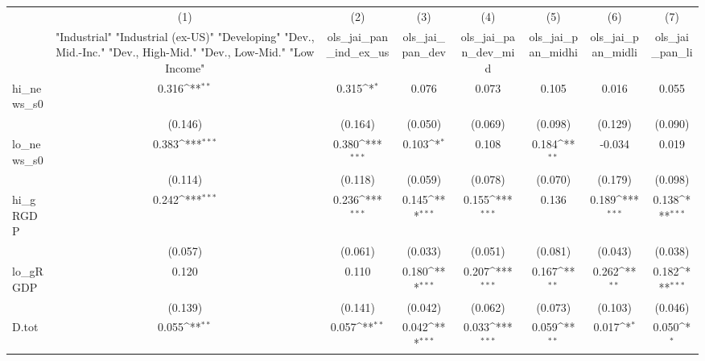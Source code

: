 {
\def\sym#1{\ifmmode^{#1}\else\(^{#1}\)\fi}
\begin{tabular}{l*{7}{c}}
\toprule
            &\multicolumn{1}{c}{(1)}&\multicolumn{1}{c}{(2)}&\multicolumn{1}{c}{(3)}&\multicolumn{1}{c}{(4)}&\multicolumn{1}{c}{(5)}&\multicolumn{1}{c}{(6)}&\multicolumn{1}{c}{(7)}\\
            &\multicolumn{1}{c}{ "Industrial" "Industrial (ex-US)" "Developing" "Dev., Mid.-Inc." "Dev., High-Mid."  "Dev., Low-Mid." "Low Income" }&\multicolumn{1}{c}{ols\_jai\_pan\_ind\_ex\_us}&\multicolumn{1}{c}{ols\_jai\_pan\_dev}&\multicolumn{1}{c}{ols\_jai\_pan\_dev\_mid}&\multicolumn{1}{c}{ols\_jai\_pan\_midhi}&\multicolumn{1}{c}{ols\_jai\_pan\_midli}&\multicolumn{1}{c}{ols\_jai\_pan\_li}\\
\midrule
hi\_news\_s0  &       0.316\sym{**} &       0.315\sym{*}  &       0.076         &       0.073         &       0.105         &       0.016         &       0.055         \\
            &     (0.146)         &     (0.164)         &     (0.050)         &     (0.069)         &     (0.098)         &     (0.129)         &     (0.090)         \\
\addlinespace
lo\_news\_s0  &       0.383\sym{***}&       0.380\sym{***}&       0.103\sym{*}  &       0.108         &       0.184\sym{**} &      -0.034         &       0.019         \\
            &     (0.114)         &     (0.118)         &     (0.059)         &     (0.078)         &     (0.070)         &     (0.179)         &     (0.098)         \\
\addlinespace
hi\_gRGDP    &       0.242\sym{***}&       0.236\sym{***}&       0.145\sym{***}&       0.155\sym{***}&       0.136         &       0.189\sym{***}&       0.138\sym{***}\\
            &     (0.057)         &     (0.061)         &     (0.033)         &     (0.051)         &     (0.081)         &     (0.043)         &     (0.038)         \\
\addlinespace
lo\_gRGDP    &       0.120         &       0.110         &       0.180\sym{***}&       0.207\sym{***}&       0.167\sym{**} &       0.262\sym{**} &       0.182\sym{***}\\
            &     (0.139)         &     (0.141)         &     (0.042)         &     (0.062)         &     (0.073)         &     (0.103)         &     (0.046)         \\
\addlinespace
D.tot       &       0.055\sym{**} &       0.057\sym{**} &       0.042\sym{***}&       0.033\sym{***}&       0.059\sym{**} &       0.017\sym{*}  &       0.050\sym{*}  \\

\end{tabular}}
